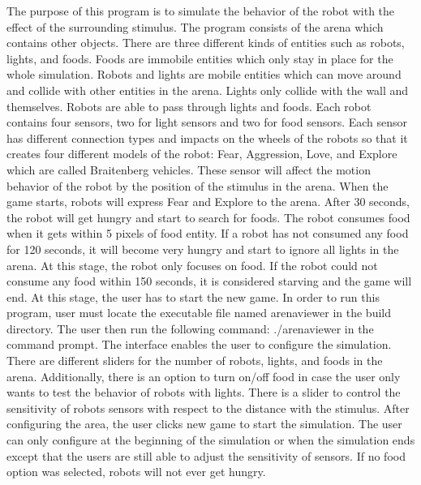 The purpose of this program is to simulate the behavior of the robot with the effect of the surrounding stimulus. The program consists of the arena which contains other objects. There are three different kinds of entities such as robots, lights, and foods. Foods are immobile entities which only stay in place for the whole simulation. Robots and lights are mobile entities which can move around and collide with other entities in the arena. Lights only collide with the wall and themselves. Robots are able to pass through lights and foods. Each robot contains four sensors, two for light sensors and two for food sensors. Each sensor has different connection types and impacts on the wheels of the robots so that it creates four different models of the robot\+: Fear, Aggression, Love, and Explore which are called Braitenberg vehicles. These sensor will affect the motion behavior of the robot by the position of the stimulus in the arena. When the game starts, robots will express Fear and Explore to the arena. After 30 seconds, the robot will get hungry and start to search for foods. The robot consumes food when it gets within 5 pixels of food entity. If a robot has not consumed any food for 120 seconds, it will become very hungry and start to ignore all lights in the arena. At this stage, the robot only focuses on food. If the robot could not consume any food within 150 seconds, it is considered starving and the game will end. At this stage, the user has to start the new game. In order to run this program, user must locate the executable file named arenaviewer in the build directory. The user then run the following command\+: ./arenaviewer in the command prompt. The interface enables the user to configure the simulation. There are different sliders for the number of robots, lights, and foods in the arena. Additionally, there is an option to turn on/off food in case the user only wants to test the behavior of robots with lights. There is a slider to control the sensitivity of robot\textquotesingle{}s sensors with respect to the distance with the stimulus. After configuring the area, the user clicks new game to start the simulation. The user can only configure at the beginning of the simulation or when the simulation ends except that the users are still able to adjust the sensitivity of sensors. If no food option was selected, robots will not ever get hungry. 